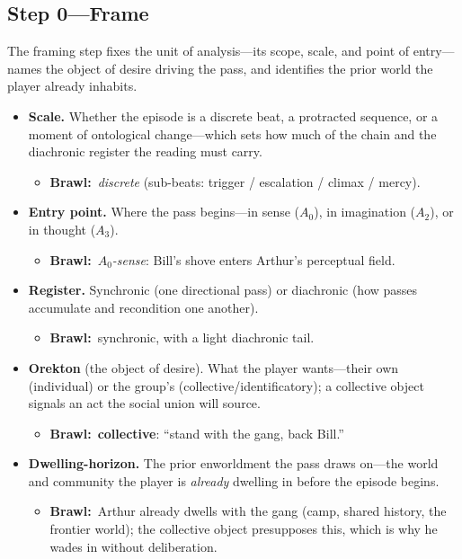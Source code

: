 \documentclass[11pt]{article}
\newcommand{\inb}{\textbf{Brawl:}~}
\begin{document}
\subsection*{Step 0---Frame}
\noindent The framing step fixes the unit of analysis---its scope, scale, and point of entry---names the object of desire driving the pass, and identifies the prior world the player already inhabits.
\begin{itemize}
  \item \textbf{Scale.} Whether the episode is a discrete beat, a protracted sequence, or a moment of ontological change---which sets how much of the chain and the diachronic register the reading must carry.
    \begin{itemize}\item \inb \emph{discrete} (sub-beats: trigger / escalation / climax / mercy).\end{itemize}
  \item \textbf{Entry point.} Where the pass begins---in sense ($A_0$), in imagination ($A_2$), or in thought ($A_3$).
    \begin{itemize}\item \inb \emph{$A_0$-sense}: Bill's shove enters Arthur's perceptual field.\end{itemize}
  \item \textbf{Register.} Synchronic (one directional pass) or diachronic (how passes accumulate and recondition one another).
    \begin{itemize}\item \inb synchronic, with a light diachronic tail.\end{itemize}
  \item \textbf{Orekton} (the object of desire). What the player wants---their own (individual) or the group's (collective/identificatory); a collective object signals an act the social union will source.
    \begin{itemize}\item \inb \textbf{collective}: ``stand with the gang, back Bill.''\end{itemize}
  \item \textbf{Dwelling-horizon.} The prior enworldment the pass draws on---the world and community the player is \emph{already} dwelling in before the episode begins.
    \begin{itemize}\item \inb Arthur already dwells with the gang (camp, shared history, the frontier world); the collective object presupposes this, which is why he wades in without deliberation.\end{itemize}
\end{itemize}
\end{document}
